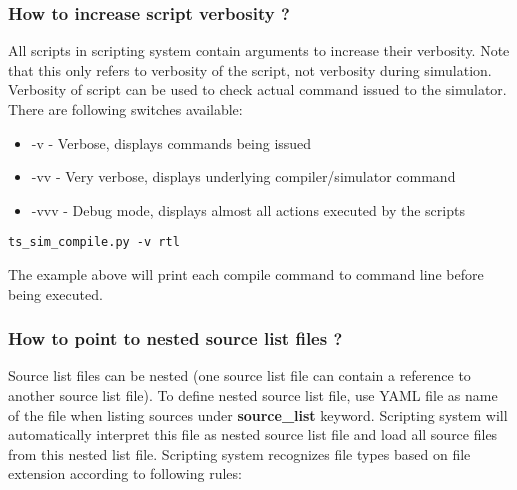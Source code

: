 \documentclass{tropic_design_spec}
\begin{document}

\subsubsection{How to increase script verbosity ?}
\label{sec:how-to-increase-script-verbosity}

All scripts in scripting system contain arguments to increase their verbosity. Note that
this only refers to verbosity of the script, not verbosity during simulation. Verbosity
of script can be used to check actual command issued to the simulator.
There are following switches available:
\begin{itemize}
    \item{-v   - Verbose, displays commands being issued}
    \item{-vv  - Very verbose, displays underlying compiler/simulator command}
    \item{-vvv - Debug mode, displays almost all actions executed by the scripts}
\end{itemize}

\begin{lstlisting}
ts_sim_compile.py -v rtl
\end{lstlisting}

The example above will print each compile command to command line before being executed.


\subsubsection{How to point to nested source list files ?}
\label{sec:how-to-point-to-nested-source-list-file}

Source list files can be nested (one source list file can contain a reference to
another source list file). To define nested source list file, use YAML file as
name of the file when listing sources under \textbf{source_list} keyword. Scripting
system will automatically interpret this file as nested source list file and load all
source files from this nested list file. Scripting system recognizes file types based
on file extension according to following rules:
\end{document}
